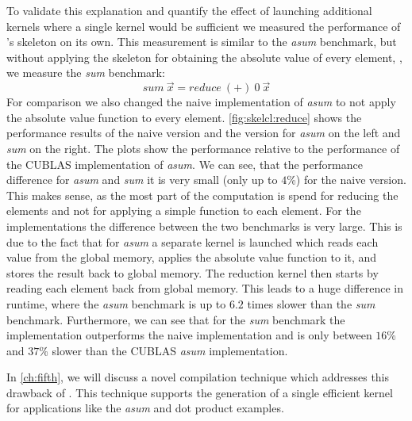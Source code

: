 To validate this explanation and quantify the effect of launching additional kernels where a single kernel would be sufficient we measured the performance of \SkelCL's \reduce skeleton on its own.
This measurement is similar to the \emph{asum} benchmark, but without applying the \map skeleton for obtaining the absolute value of every element, \ie, we measure the \emph{sum} benchmark:
\begin{equation}
  sum\ \vec{x} = reduce\ (+)\ 0\ \vec{x}
  \label{eq:sum}
\end{equation}
For comparison we also changed the naive \OpenCL implementation of \emph{asum} to not apply the absolute value function to every element.
\autoref{fig:skelcl:reduce} shows the performance results of the naive \OpenCL version and the \SkelCL version for \emph{asum} on the left and \emph{sum} on the right.
The plots show the performance relative to the performance of the CUBLAS implementation of \emph{asum}.
We can see, that the performance difference for \emph{asum} and \emph{sum} it is very small (only up to $4$\%) for the naive \OpenCL version.
This makes sense, as the most part of the computation is spend for reducing the elements and not for applying a simple function to each element.
For the \SkelCL implementations the difference between the two benchmarks is very large.
This is due to the fact that for \emph{asum} a separate \OpenCL kernel is launched which reads each value from the global memory, applies the absolute value function to it, and stores the result back to global memory.
The reduction kernel then starts by reading each element back from global memory.
This leads to a huge difference in runtime, where the \emph{asum} benchmark is up to $6.2$ times slower than the \emph{sum} benchmark.
Furthermore, we can see that for the \emph{sum} benchmark the \SkelCL implementation outperforms the naive \OpenCL implementation and is only between $16$\% and $37$\% slower than the CUBLAS \emph{asum} implementation.

In \autoref{ch:fifth}, we will discuss a novel compilation technique which addresses this drawback of \SkelCL.
This technique supports the generation of a single efficient \OpenCL kernel for applications like the \emph{asum} and dot product examples.

